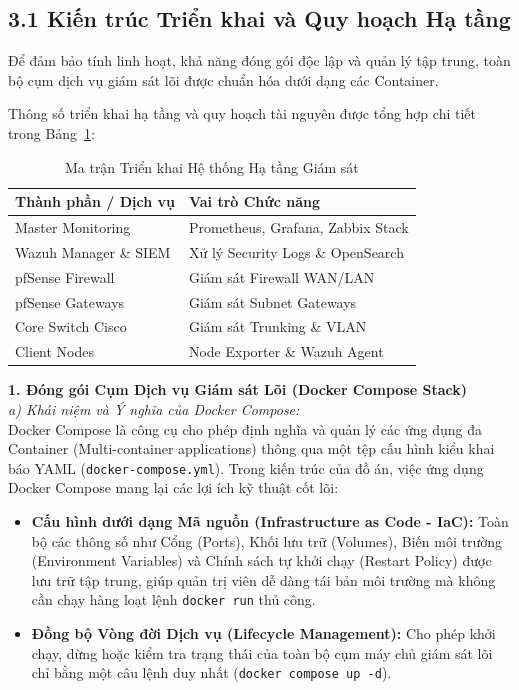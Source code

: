 \documentclass[13pt,a4paper]{extarticle}
\begin{document}
\subsection{3.1 Kiến trúc Triển khai và Quy hoạch Hạ tầng}
Để đảm bảo tính linh hoạt, khả năng đóng gói độc lập và quản lý tập trung, toàn bộ cụm dịch vụ giám sát lõi được chuẩn hóa dưới dạng các Container. 

Thông số triển khai hạ tầng và quy hoạch tài nguyên được tổng hợp chi tiết trong Bảng~\ref{tab:deployment_matrix}:

\begin{table}[H]
\centering
\caption{Ma trận Triển khai Hệ thống Hạ tầng Giám sát}
\label{tab:deployment_matrix}
\begin{tabularx}{\textwidth}{|l|X|}
\hline
\textbf{Thành phần / Dịch vụ} & \textbf{Vai trò Chức năng} \\ \hline
Master Monitoring & Prometheus, Grafana, Zabbix Stack \\ \hline
Wazuh Manager \& SIEM & Xử lý Security Logs \& OpenSearch \\ \hline
pfSense Firewall & Giám sát Firewall WAN/LAN \\ \hline
pfSense Gateways & Giám sát Subnet Gateways \\ \hline
Core Switch Cisco & Giám sát Trunking \& VLAN \\ \hline
Client Nodes & Node Exporter \& Wazuh Agent \\ \hline
\end{tabularx}
\end{table}

\textbf{1. Đóng gói Cụm Dịch vụ Giám sát Lõi (Docker Compose Stack)}\\
\textit{a) Khái niệm và Ý nghĩa của Docker Compose:}\\
Docker Compose là công cụ cho phép định nghĩa và quản lý các ứng dụng đa Container (Multi-container applications) thông qua một tệp cấu hình kiểu khai báo YAML (\texttt{docker-compose.yml}). Trong kiến trúc của đồ án, việc ứng dụng Docker Compose mang lại các lợi ích kỹ thuật cốt lõi:
\begin{itemize}
    \item \textbf{Cấu hình dưới dạng Mã nguồn (Infrastructure as Code - IaC):} Toàn bộ các thông số như Cổng (Ports), Khối lưu trữ (Volumes), Biến môi trường (Environment Variables) và Chính sách tự khởi chạy (Restart Policy) được lưu trữ tập trung, giúp quản trị viên dễ dàng tái bản môi trường mà không cần chạy hàng loạt lệnh \texttt{docker run} thủ công.
    \item \textbf{Đồng bộ Vòng đời Dịch vụ (Lifecycle Management):} Cho phép khởi chạy, dừng hoặc kiểm tra trạng thái của toàn bộ cụm máy chủ giám sát lõi chỉ bằng một câu lệnh duy nhất (\texttt{docker compose up -d}).
\end{itemize}
\end{document}
